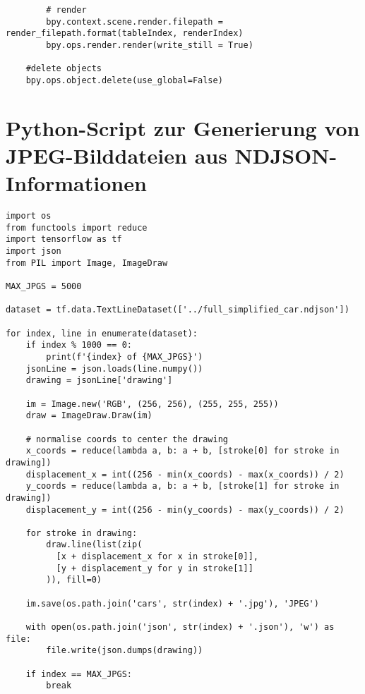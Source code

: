 \begin{lstlisting}
        # render
        bpy.context.scene.render.filepath = render_filepath.format(tableIndex, renderIndex)
        bpy.ops.render.render(write_still = True)

    #delete objects
    bpy.ops.object.delete(use_global=False)
\end{lstlisting}

\vfill
\pagebreak

\section{Python-Script zur Generierung von JPEG-Bilddateien aus NDJSON-Informationen}
\label{ndjsonpy}

\begin{lstlisting}
import os
from functools import reduce
import tensorflow as tf
import json
from PIL import Image, ImageDraw

MAX_JPGS = 5000

dataset = tf.data.TextLineDataset(['../full_simplified_car.ndjson'])

for index, line in enumerate(dataset):
    if index % 1000 == 0:
        print(f'{index} of {MAX_JPGS}')
    jsonLine = json.loads(line.numpy())
    drawing = jsonLine['drawing']

    im = Image.new('RGB', (256, 256), (255, 255, 255))
    draw = ImageDraw.Draw(im)

    # normalise coords to center the drawing
    x_coords = reduce(lambda a, b: a + b, [stroke[0] for stroke in drawing])
    displacement_x = int((256 - min(x_coords) - max(x_coords)) / 2)
    y_coords = reduce(lambda a, b: a + b, [stroke[1] for stroke in drawing])
    displacement_y = int((256 - min(y_coords) - max(y_coords)) / 2)

    for stroke in drawing:
        draw.line(list(zip(
          [x + displacement_x for x in stroke[0]],
          [y + displacement_y for y in stroke[1]]
        )), fill=0)

    im.save(os.path.join('cars', str(index) + '.jpg'), 'JPEG')

    with open(os.path.join('json', str(index) + '.json'), 'w') as file:
        file.write(json.dumps(drawing))

    if index == MAX_JPGS:
        break
\end{lstlisting}
